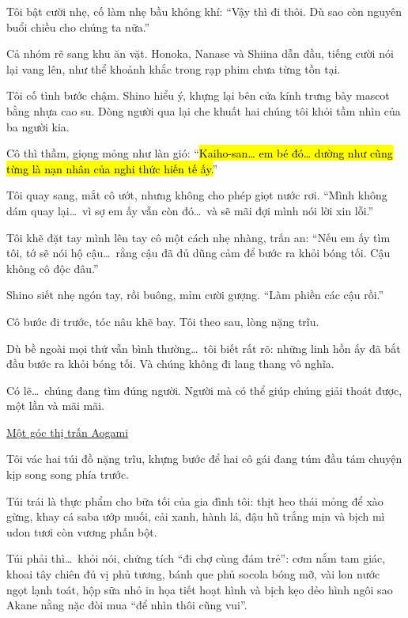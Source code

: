 \documentclass[../main.tex]{subfiles}
\begin{document}
Tôi bật cười nhẹ, cố làm nhẹ bầu không khí: ``Vậy thì đi thôi. Dù sao còn nguyên buổi chiều cho chúng ta nữa.''

Cả nhóm rẽ sang khu ăn vặt. Honoka, Nanase và Shiina dẫn đầu, tiếng cười nói lại vang lên, như thể khoảnh khắc trong rạp phim chưa từng tồn tại.

Tôi cố tình bước chậm. Shino hiểu ý, khựng lại bên cửa kính trưng bày mascot bằng nhựa cao su. Dòng người qua lại che khuất hai chúng tôi khỏi tầm nhìn của ba người kia.

Cô thì thầm, giọng mỏng như làn gió: ``\hl{Kaiho-san\dots{} em bé đó\dots{} dường như cũng từng là nạn nhân của nghi thức hiến tế ấy.}''

Tôi quay sang, mắt cô ướt, nhưng không cho phép giọt nước rơi. ``Mình không dám quay lại\dots\ vì sợ em ấy vẫn còn đó\dots\ và sẽ mãi đợi mình nói lời xin lỗi.''

Tôi khẽ đặt tay mình lên tay cô một cách nhẹ nhàng, trấn an: ``Nếu em ấy tìm tôi, tớ sẽ nói hộ cậu\dots\ rằng cậu đã đủ dũng cảm để bước ra khỏi bóng tối. Cậu không cô độc đâu.''

Shino siết nhẹ ngón tay, rồi buông, mỉm cười gượng. ``Làm phiền các cậu rồi.''

Cô bước đi trước, tóc nâu khẽ bay. Tôi theo sau, lòng nặng trĩu.

Dù bề ngoài mọi thứ vẫn bình thường\dots\ tôi biết rất rõ: những linh hồn ấy đã bắt đầu bước ra khỏi bóng tối. Và chúng không đi lang thang vô nghĩa.

Có lẽ\dots\ chúng đang tìm đúng người. Người mà có thể giúp chúng giải thoát được, một lần và mãi mãi.

\begin{center}
  \uline{Một góc thị trấn Aogami}
\end{center}

Tôi vác hai túi đồ nặng trĩu, khựng bước để hai cô gái đang túm đầu tám chuyện kịp song song phía trước.

Túi trái là thực phẩm cho bữa tối của gia đình tôi: thịt heo thái mỏng để xào gừng, khay cá saba ướp muối, cải xanh, hành lá, đậu hũ trắng mịn và bịch mì udon tươi còn vương phấn bột.

Túi phải thì\dots\ khỏi nói, chứng tích ``đi chợ cùng đám trẻ'': cơm nắm tam giác, khoai tây chiên đủ vị phủ tương, bánh que phủ socola bóng mỡ, vài lon nước ngọt lạnh toát, hộp sữa nhỏ in họa tiết hoạt hình và bịch kẹo dẻo hình ngôi sao Akane nằng nặc đòi mua ``để nhìn thôi cũng vui''.
\end{document}
